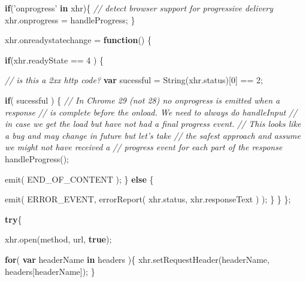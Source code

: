 \documentclass[]{article}
\newenvironment{Shaded}{}{}
\newcommand{\KeywordTok}[1]{\textcolor[rgb]{0.00,0.44,0.13}{\textbf{{#1}}}}
\newcommand{\DecValTok}[1]{\textcolor[rgb]{0.25,0.63,0.44}{{#1}}}
\newcommand{\StringTok}[1]{\textcolor[rgb]{0.25,0.44,0.63}{{#1}}}
\newcommand{\CommentTok}[1]{\textcolor[rgb]{0.38,0.63,0.69}{\textit{{#1}}}}
\newcommand{\OtherTok}[1]{\textcolor[rgb]{0.00,0.44,0.13}{{#1}}}
\newcommand{\FunctionTok}[1]{\textcolor[rgb]{0.02,0.16,0.49}{{#1}}}
\newcommand{\NormalTok}[1]{{#1}}
\begin{document}
\begin{Shaded}
\begin{Highlighting}[]
   
   \KeywordTok{if}\NormalTok{(}\StringTok{'onprogress'} \KeywordTok{in} \NormalTok{xhr)\{  }\CommentTok{// detect browser support for progressive delivery}
      \OtherTok{xhr}\NormalTok{.}\FunctionTok{onprogress} \NormalTok{= handleProgress;}
   \NormalTok{\}}
   
   \OtherTok{xhr}\NormalTok{.}\FunctionTok{onreadystatechange} \NormalTok{= }\KeywordTok{function}\NormalTok{() \{}
            
      \KeywordTok{if}\NormalTok{(}\OtherTok{xhr}\NormalTok{.}\FunctionTok{readyState} \NormalTok{== }\DecValTok{4} \NormalTok{) \{}

         \CommentTok{// is this a 2xx http code?}
         \KeywordTok{var} \NormalTok{sucessful = }\FunctionTok{String}\NormalTok{(}\OtherTok{xhr}\NormalTok{.}\FunctionTok{status}\NormalTok{)[}\DecValTok{0}\NormalTok{] == }\DecValTok{2}\NormalTok{;}
         
         \KeywordTok{if}\NormalTok{( sucessful ) \{}
            \CommentTok{// In Chrome 29 (not 28) no onprogress is emitted when a response}
            \CommentTok{// is complete before the onload. We need to always do handleInput}
            \CommentTok{// in case we get the load but have not had a final progress event.}
            \CommentTok{// This looks like a bug and may change in future but let's take}
            \CommentTok{// the safest approach and assume we might not have received a }
            \CommentTok{// progress event for each part of the response}
            \FunctionTok{handleProgress}\NormalTok{();}
            
            \FunctionTok{emit}\NormalTok{( END_OF_CONTENT );}
         \NormalTok{\} }\KeywordTok{else} \NormalTok{\{}
         
            \FunctionTok{emit}\NormalTok{( }
               \NormalTok{ERROR_EVENT, }
               \FunctionTok{errorReport}\NormalTok{(}
                  \OtherTok{xhr}\NormalTok{.}\FunctionTok{status}\NormalTok{, }
                  \OtherTok{xhr}\NormalTok{.}\FunctionTok{responseText}
               \NormalTok{)}
            \NormalTok{);}
         \NormalTok{\}}
      \NormalTok{\}}
   \NormalTok{\};}

   \KeywordTok{try}\NormalTok{\{}
   
      \OtherTok{xhr}\NormalTok{.}\FunctionTok{open}\NormalTok{(method, url, }\KeywordTok{true}\NormalTok{);}
   
      \KeywordTok{for}\NormalTok{( }\KeywordTok{var} \NormalTok{headerName }\KeywordTok{in} \NormalTok{headers )\{}
         \OtherTok{xhr}\NormalTok{.}\FunctionTok{setRequestHeader}\NormalTok{(headerName, headers[headerName]);}
      \NormalTok{\}}
      

\end{Highlighting}
\end{Shaded}
\end{document}
